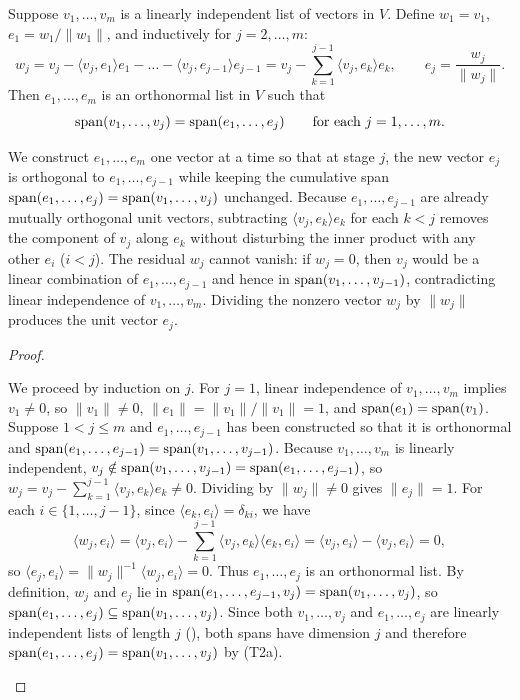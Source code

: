 \documentclass[10pt]{scrartcl}
\newcommand{\ip}[2]{\langle #1,#2\rangle}
\begin{document}
\begin{theorem*}
  Suppose $v_1,\dots,v_m$ is a linearly independent list of vectors in $V$. Define $w_1=v_1$, $e_1=w_1/\|w_1\|$, and inductively for $j=2,\dots,m$:
  \[
    w_j = v_j - \ip{v_j}{e_1}e_1 - \dots - \ip{v_j}{e_{j-1}}e_{j-1} = v_j - \sum_{k=1}^{j-1}\ip{v_j}{e_k}e_k, \qquad e_j = \frac{w_j}{\|w_j\|}.
  \]
  Then $e_1,\dots,e_m$ is an orthonormal list in $V$ such that
  \[
    \operatorname{span}(v_1,\dots,v_j) = \operatorname{span}(e_1,\dots,e_j) \qquad\text{for each }j=1,\dots,m.
  \]
\end{theorem*}
\begin{ideabox}
  We construct $e_1,\dots,e_m$ one vector at a time so that at stage $j$, the new vector $e_j$ is orthogonal to $e_1,\dots,e_{j-1}$ while keeping the cumulative span $\operatorname{span}(e_1,\dots,e_j)=\operatorname{span}(v_1,\dots,v_j)$ unchanged. Because $e_1,\dots,e_{j-1}$ are already mutually orthogonal unit vectors, subtracting $\ip{v_j}{e_k}e_k$ for each $k<j$ removes the component of $v_j$ along $e_k$ without disturbing the inner product with any other $e_i$ ($i<j$). The residual $w_j$ cannot vanish: if $w_j=0$, then $v_j$ would be a linear combination of $e_1,\dots,e_{j-1}$ and hence in $\operatorname{span}(v_1,\dots,v_{j-1})$, contradicting linear independence of $v_1,\dots,v_m$. Dividing the nonzero vector $w_j$ by $\|w_j\|$ produces the unit vector $e_j$.
\end{ideabox}
\begin{proof}
  \begin{steps}
    \ii We proceed by induction on $j$. For $j=1$, linear independence of $v_1,\dots,v_m$ implies $v_1\ne 0$, so $\|v_1\|\ne 0$, $\|e_1\|=\|v_1\|/\|v_1\|=1$, and $\operatorname{span}(e_1)=\operatorname{span}(v_1)$.
    \ii Suppose $1<j\le m$ and $e_1,\dots,e_{j-1}$ has been constructed so that it is orthonormal and $\operatorname{span}(e_1,\dots,e_{j-1})=\operatorname{span}(v_1,\dots,v_{j-1})$. Because $v_1,\dots,v_m$ is linearly independent, $v_j\notin\operatorname{span}(v_1,\dots,v_{j-1})=\operatorname{span}(e_1,\dots,e_{j-1})$, so $w_j=v_j-\sum_{k=1}^{j-1}\ip{v_j}{e_k}e_k\ne 0$.
    \ii Dividing by $\|w_j\|\ne 0$ gives $\|e_j\|=1$. For each $i\in\{1,\dots,j-1\}$, since $\ip{e_k}{e_i}=\delta_{ki}$, we have
    \[
      \ip{w_j}{e_i} = \ip{v_j}{e_i} - \sum_{k=1}^{j-1}\ip{v_j}{e_k}\ip{e_k}{e_i} = \ip{v_j}{e_i} - \ip{v_j}{e_i} = 0,
    \]
    so $\ip{e_j}{e_i}=\|w_j\|^{-1}\ip{w_j}{e_i}=0$. Thus $e_1,\dots,e_j$ is an orthonormal list.
    \ii By definition, $w_j$ and $e_j$ lie in $\operatorname{span}(e_1,\dots,e_{j-1},v_j)=\operatorname{span}(v_1,\dots,v_j)$, so $\operatorname{span}(e_1,\dots,e_j)\subseteq\operatorname{span}(v_1,\dots,v_j)$. Since both $v_1,\dots,v_j$ and $e_1,\dots,e_j$ are linearly independent lists of length $j$ (), both spans have dimension $j$ and therefore $\operatorname{span}(e_1,\dots,e_j)=\operatorname{span}(v_1,\dots,v_j)$ by (T2a).
  \end{steps}
\end{proof}
\end{document}
